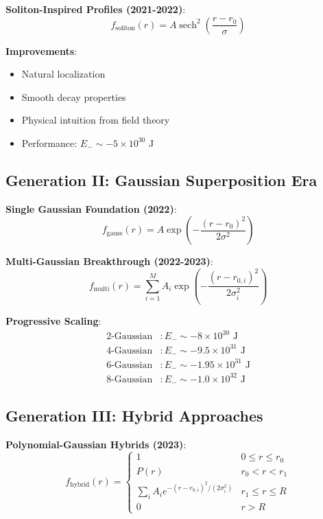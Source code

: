 \documentclass[11pt,a4paper]{article}
\begin{document}
\textbf{Soliton-Inspired Profiles (2021-2022)}:
\begin{equation}
f_{\text{soliton}}(r) = A \operatorname{sech}^2\left(\frac{r - r_0}{\sigma}\right)
\end{equation}

\textbf{Improvements}:
\begin{itemize}
\item Natural localization
\item Smooth decay properties
\item Physical intuition from field theory
\item Performance: $E_- \sim -5 \times 10^{30}$ J
\end{itemize}

\subsection{Generation II: Gaussian Superposition Era}

\textbf{Single Gaussian Foundation (2022)}:
\begin{equation}
f_{\text{gauss}}(r) = A \exp\left(-\frac{(r - r_0)^2}{2\sigma^2}\right)
\end{equation}

\textbf{Multi-Gaussian Breakthrough (2022-2023)}:
\begin{equation}
f_{\text{multi}}(r) = \sum_{i=1}^{M} A_i \exp\left(-\frac{(r - r_{0,i})^2}{2\sigma_i^2}\right)
\end{equation}

\textbf{Progressive Scaling}:
\begin{align}
\text{2-Gaussian} &: E_- \sim -8 \times 10^{30} \text{ J} \\
\text{4-Gaussian} &: E_- \sim -9.5 \times 10^{31} \text{ J} \\
\text{6-Gaussian} &: E_- \sim -1.95 \times 10^{31} \text{ J} \\
\text{8-Gaussian} &: E_- \sim -1.0 \times 10^{32} \text{ J}
\end{align}

\subsection{Generation III: Hybrid Approaches}

\textbf{Polynomial-Gaussian Hybrids (2023)}:
\begin{equation}
f_{\text{hybrid}}(r) = \begin{cases}
1 & 0 \leq r \leq r_0 \\
P(r) & r_0 < r < r_1 \\
\sum_i A_i e^{-(r-r_{0,i})^2/(2\sigma_i^2)} & r_1 \leq r \leq R \\
0 & r > R
\end{cases}
\end{equation}
\end{document}
